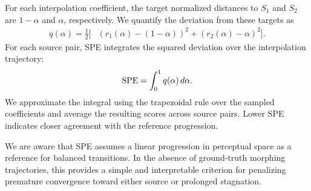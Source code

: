 For each interpolation coefficient, the target normalized distances to $S_1$ and $S_2$ are $1-\alpha$ and $\alpha$, respectively. We quantify the deviation from these targets as
\begin{equation}
 \begin{aligned}
 q(\alpha)=\frac12\big[
 &(r_1(\alpha)-(1-\alpha))^2+(r_2(\alpha)-\alpha)^2\big].
 \label{eq:profile_error}
 \end{aligned}
\end{equation}
For each source pair, SPE integrates the squared deviation over the interpolation trajectory:
\begin{equation}
 \mathrm{SPE}=\int_0^1 q(\alpha)\,d\alpha.
 \label{eq:spe}
\end{equation}
We approximate the integral using the trapezoidal rule over the sampled coefficients and average the resulting scores across source pairs. Lower SPE indicates closer agreement with the reference progression.

We are aware that SPE assumes a linear progression in perceptual space as a reference for balanced transitions. In the absence of ground-truth morphing trajectories, this provides a simple and interpretable criterion for penalizing premature convergence toward either source or prolonged stagnation.%

